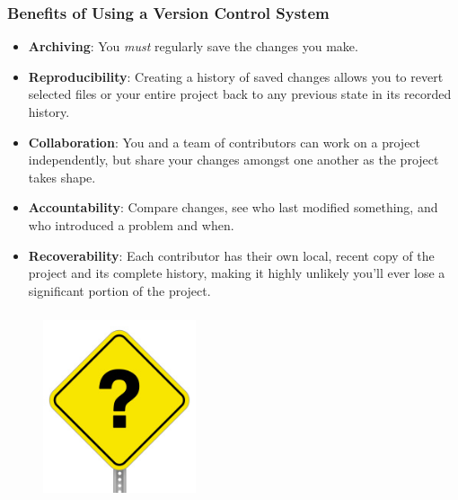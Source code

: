 \documentclass{beamer}
\begin{document}
\begin{frame}
   \frametitle{Benefits of Using a Version Control System} 
   \begin{itemize}
      \setlength\itemsep{1.0em}
      \item \textbf{Archiving}: You \textit{must} regularly save the 
         changes you make.
      \item \textbf{Reproducibility}: Creating a history of saved 
         changes allows you to revert selected files or your entire 
         project back to any previous state in its recorded history.
      \item \textbf{Collaboration}: You and a team of contributors can 
         work on a project independently, but share your changes amongst 
         one another as the project takes shape.
      \item \textbf{Accountability}: Compare changes, see who last 
         modified something, and who introduced a problem and when.
      \item \textbf{Recoverability}: Each contributor has their own 
         local, recent copy of the project and its complete history,
         making it highly unlikely you'll ever lose a significant 
         portion of the project.
   \end{itemize} 
\end{frame}

\begin{frame}
   \frametitle{}
   \vspace{-1.0em}
   \begin{figure}[htbp]
      \includegraphics[width=0.4\textwidth]{images/question-mark-sign.jpg}
   \end{figure}
\end{frame}
\end{document}
